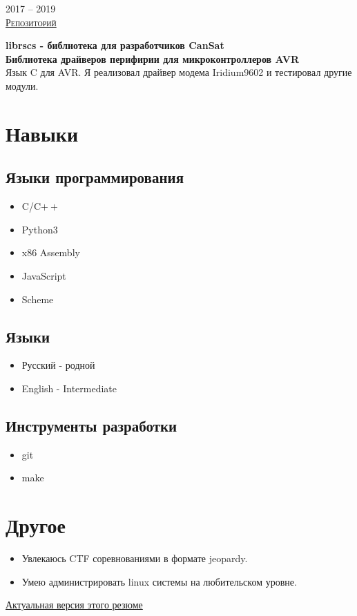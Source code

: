 \documentclass{article}
\newcommand{\entry}[3]{
    \begin{minipage}[t]{.11\linewidth}
        \hfill \textsc{#1}
    \end{minipage}
    \hfill\vline\hfill
    \begin{minipage}[t]{.80\linewidth}
        \textbf{#2} \\
        \footnotesize{#3}
    \end{minipage}
}
\begin{document}
    \entry {2017 -- 2019 \\
    \href {https://github.com/cansat-rsce/librscs} {Репозиторий} }
    {librscs - библиотека для разработчиков CanSat \\
    Библиотека драйверов перифирии для микроконтроллеров AVR}
    {Язык C для AVR. Я реализовал драйвер модема Iridium9602 и тестировал другие модули.} 

    \section{Навыки}
        \begin{multicols}{2}
            \subsection{Языки программирования}
                \begin{itemize}
                    \item C/C$\boldsymbol{++}$
                    \item Python3
                    \item x86 Assembly
                    \item JavaScript
                    \item Scheme
                \end{itemize}
            \subsection{Языки}
                \begin{itemize}
                    \item Русский - родной
                    \item English - Intermediate
                \end{itemize}
            \subsection{Инструменты разработки}
                \begin{itemize}
                    \item git
                    \item make
                \end{itemize}
        \end{multicols}
        
    \section{Другое}
        \begin{itemize}
            \item Увлекаюсь CTF соревнованиями в формате jeopardy. 
            \item Умею администрировать linux системы на любительском уровне.
        \end{itemize}
    \vspace{\fill}
    \begin{center}
        \large
        \href {https://github.com/InversionSpaces/resume}{Актуальная версия этого резюме}
    \end{center}
\end{document}
